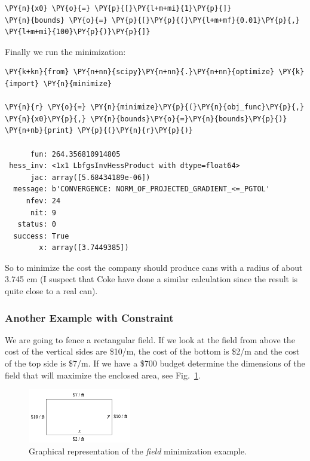 \begin{codebox}
\begin{Verbatim}[commandchars=\\\{\}]
\PY{n}{x0} \PY{o}{=} \PY{p}{[}\PY{l+m+mi}{1}\PY{p}{]}
\PY{n}{bounds} \PY{o}{=} \PY{p}{[}\PY{p}{(}\PY{l+m+mf}{0.01}\PY{p}{,} \PY{l+m+mi}{100}\PY{p}{)}\PY{p}{]}
\end{Verbatim}
\end{codebox}
\noindent
Finally we run the minimization:

\begin{codebox}
\begin{Verbatim}[commandchars=\\\{\}]
\PY{k+kn}{from} \PY{n+nn}{scipy}\PY{n+nn}{.}\PY{n+nn}{optimize} \PY{k}{import} \PY{n}{minimize}

\PY{n}{r} \PY{o}{=} \PY{n}{minimize}\PY{p}{(}\PY{n}{obj_func}\PY{p}{,} \PY{n}{x0}\PY{p}{,} \PY{n}{bounds}\PY{o}{=}\PY{n}{bounds}\PY{p}{)}
\PY{n+nb}{print} \PY{p}{(}\PY{n}{r}\PY{p}{)}

      fun: 264.356810914805
 hess_inv: <1x1 LbfgsInvHessProduct with dtype=float64>
      jac: array([5.68434189e-06])
  message: b'CONVERGENCE: NORM_OF_PROJECTED_GRADIENT_<=_PGTOL'
     nfev: 24
      nit: 9
   status: 0
  success: True
        x: array([3.7449385])
    \end{Verbatim}
\end{codebox}

So to minimize the cost the company should produce cans with a radius of
about 3.745 cm (I suspect that Coke have done a similar calculation since the result is quite close to a real can).

\subsubsection{Another Example with Constraint}
\label{example-with-constraint}

We are going to fence a rectangular field. If we look at the field
from above the cost of the vertical sides are \$10/m, the cost of the
bottom is \$2/m and the cost of the top side is \$7/m. If we have a \$700 budget determine
the dimensions of the field that will maximize the enclosed area, see Fig.~\ref{fig:field}.

\begin{figure}[h]
\centering
\includegraphics[width=0.4\textwidth]{figures/field.png}
\caption{Graphical representation of the \emph{field} minimization example.}
\label{fig:field}
\end{figure}


